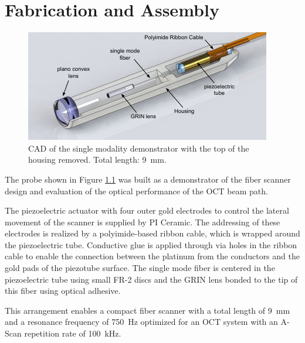 %
\chapter{Fabrication and Assembly}
\label{Ch:Fab}	

\begin{figure}[h!]\centering 
\includegraphics[width=\columnwidth]{figures/40_Fabrication/overview.pdf}
      \caption{CAD of the single modality demonstrator with the top of the housing removed. Total length: \SI{9}{\milli\meter}.}
      \label{fig:overview}
\end{figure}

The probe shown in Figure \ref{fig:overview} was built as a demonstrator of the fiber scanner design and evaluation of the optical performance of the OCT beam path.

The piezoelectric actuator with four outer gold electrodes to control the lateral movement of the scanner is supplied by PI Ceramic. The addressing of these electrodes is realized by a polyimide-based ribbon cable, which is wrapped around the piezoelectric tube. Conductive glue is applied through via holes in the ribbon cable to enable the connection between the platinum from the conductors and the gold pads of the piezotube surface. The single mode fiber is centered in the piezoelectric tube using small FR-2 discs and the GRIN lens bonded to the tip of this fiber using optical adhesive. 

This arrangement enables a compact fiber scanner with a total length of \SI{9}{\milli\meter} and a resonance frequency of \SI{750}{\hertz} optimized for an OCT system with an A-Scan repetition rate of \SI{100}{\kilo\hertz}.

